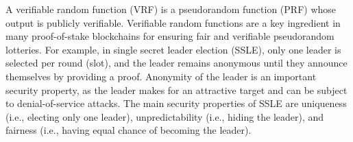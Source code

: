 

\def\eprintsmallskip{\smallskip}{}%
A verifiable random function (VRF) is a pseudorandom function (PRF) whose output is publicly verifiable.
Verifiable random functions are a key ingredient in many proof-of-stake blockchains for ensuring fair and verifiable pseudorandom lotteries.
For example, in single secret leader election (SSLE), only one leader is selected per round (slot), and the
leader remains anonymous until they announce themselves by providing a proof.
Anonymity of the leader is an important security property, as the leader makes for an attractive target and can be subject to denial-of-service attacks.
The main security properties of SSLE are uniqueness (i.e., electing only one leader), unpredictability (i.e., hiding the leader), and fairness (i.e., having equal chance of becoming the leader).

